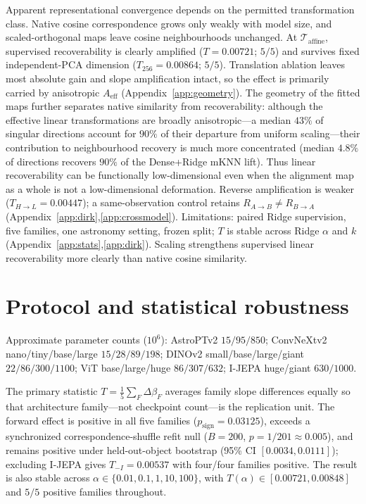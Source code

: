 \documentclass{article}
\begin{document}
Apparent representational convergence depends on the permitted transformation class.
Native cosine correspondence grows only weakly with model size, and scaled-orthogonal maps leave cosine neighbourhoods unchanged.
At \(\mathcal{T}_{\mathrm{affine}}\), supervised recoverability is clearly amplified (\(T{=}0.00721\); \(5/5\)) and survives fixed independent-PCA dimension (\(T_{256}{=}0.00864\); \(5/5\)).
Translation ablation leaves most absolute gain and slope amplification intact, so the effect is primarily carried by anisotropic \(A_{\mathrm{eff}}\) (Appendix~\ref{app:geometry}).
The geometry of the fitted maps further separates native similarity from recoverability: although the effective linear transformations are broadly anisotropic---a median \(43\%\) of singular directions account for \(90\%\) of their departure from uniform scaling---their contribution to neighbourhood recovery is much more concentrated (median \(4.8\%\) of directions recovers \(90\%\) of the Dense+Ridge mKNN lift).
Thus linear recoverability can be functionally low-dimensional even when the alignment map as a whole is not a low-dimensional deformation.
Reverse amplification is weaker (\(T_{H\to L}{=}0.00447\)); a same-observation control retains \(R_{A\to B}\neq R_{B\to A}\) (Appendix~\ref{app:dirk},\ref{app:crossmodel}).
Limitations: paired Ridge supervision, five families, one astronomy setting, frozen split; \(T\) is stable across Ridge \(\alpha\) and \(k\) (Appendix~\ref{app:stats},\ref{app:dirk}).
Scaling strengthens supervised linear recoverability more clearly than native cosine similarity.

\FloatBarrier
{\small


}


\appendix
\section{Protocol and statistical robustness}\label{app:details}\label{app:stats}

Approximate parameter counts (\(10^{6}\)):
AstroPTv2 \(15/95/850\);
ConvNeXtv2 nano/tiny/base/large \(15/28/89/198\);
DINOv2 small/base/large/giant \(22/86/300/1100\);
ViT base/large/huge \(86/307/632\);
I-JEPA huge/giant \(630/1000\).

The primary statistic \(T=\tfrac15\sum_F\Delta\beta_F\) averages family slope differences equally so that architecture family---not checkpoint count---is the replication unit.
The forward effect is positive in all five families (\(p_{\mathrm{sign}}{=}0.03125\)), exceeds a synchronized correspondence-shuffle refit null (\(B{=}200\), \(p{=}1/201\approx0.005\)), and remains positive under held-out-object bootstrap (95\% CI \([0.0034,0.0111]\)); excluding I-JEPA gives \(T_{-I}{=}0.00537\) with four/four families positive.
The result is also stable across \(\alpha\in\{0.01,0.1,1,10,100\}\), with \(T(\alpha)\in[0.00721,0.00848]\) and \(5/5\) positive families throughout.
\end{document}
